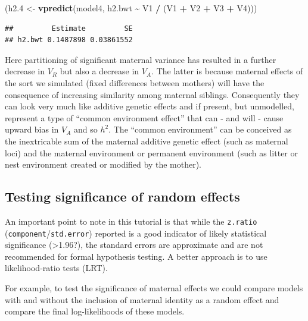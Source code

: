 \documentclass[
  12pt,
]{book}
\newenvironment{Shaded}{\begin{snugshade}}{\end{snugshade}}
\newcommand{\FloatTok}[1]{\textcolor[rgb]{0.00,0.00,0.81}{#1}}
\newcommand{\KeywordTok}[1]{\textcolor[rgb]{0.13,0.29,0.53}{\textbf{#1}}}
\newcommand{\NormalTok}[1]{#1}
\newcommand{\OperatorTok}[1]{\textcolor[rgb]{0.81,0.36,0.00}{\textbf{#1}}}
\newcommand{\StringTok}[1]{\textcolor[rgb]{0.31,0.60,0.02}{#1}}
\begin{document}
\begin{Shaded}
\begin{Highlighting}[]
\NormalTok{(h2}\FloatTok{.4}\NormalTok{ \textless{}{-}}\StringTok{ }\KeywordTok{vpredict}\NormalTok{(model4, h2.bwt }\OperatorTok{\textasciitilde{}}\StringTok{ }\NormalTok{V1 }\OperatorTok{/}\StringTok{ }\NormalTok{(V1 }\OperatorTok{+}\StringTok{ }\NormalTok{V2 }\OperatorTok{+}\StringTok{ }\NormalTok{V3 }\OperatorTok{+}\StringTok{ }\NormalTok{V4)))}
\end{Highlighting}
\end{Shaded}

\begin{verbatim}
##         Estimate         SE
## h2.bwt 0.1487898 0.03861552
\end{verbatim}

Here partitioning of significant maternal variance has resulted in a further decrease in \(V_R\) but also a decrease in \(V_A\). The latter is because maternal effects of the sort we simulated (fixed differences between mothers) will have the consequence of increasing similarity among maternal siblings. Consequently they can look very much like additive genetic effects and if present, but unmodelled, represent a type of ``common environment effect'' that can - and will - cause upward bias in \(V_A\) and so \(h^2\).
The ``common environment'' can be conceived as the inextricable sum of the maternal additive genetic effect (such as maternal loci) and the maternal environment or permanent environment (such as litter or nest environment created or modified by the mother).

\hypertarget{testing-significance-of-random-effects}{%
\subsection{Testing significance of random effects}\label{testing-significance-of-random-effects}}

An important point to note in this tutorial is that while the \texttt{z.ratio} (\texttt{component}/\texttt{std.error}) reported is a good indicator of likely statistical significance (\textgreater1.96?), the standard errors are approximate and are not recommended for formal hypothesis testing. A better approach is to use likelihood-ratio tests (LRT).

For example, to test the significance of maternal effects we could compare models with and without the inclusion of maternal identity as a random effect and compare the final log-likelihoods of these models.
\end{document}

